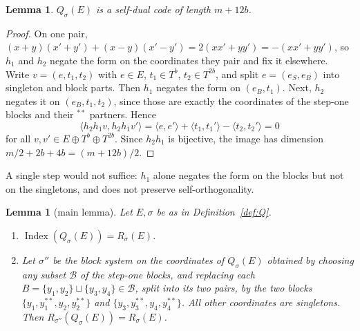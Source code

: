 \documentclass[11pt]{amsart}
\newtheorem{lemma}[theorem]{Lemma}
\theoremstyle{definition}
\newcommand{\Index}{\operatorname{Index}}
\begin{document}
\begin{lemma}
$Q_\sigma(E)$ is a self-dual code of length $m+12b$.
\end{lemma}

\begin{proof}
On one pair, $(x+y)(x'+y')+(x-y)(x'-y')=2(xx'+yy')=-(xx'+yy')$, so $h_1$ and $h_2$ negate the
form on the coordinates they pair and fix it elsewhere. Write $v=(e,t_1,t_2)$ with $e\in E$,
$t_1\in T^b$, $t_2\in T^{2b}$, and split $e=(e_S,e_B)$ into singleton and block parts. Then $h_1$
negates the form on $(e_B,t_1)$. Next, $h_2$ negates it on $(e_B,t_1,t_2)$, since those are exactly the coordinates of the step-one blocks and their $^{**}$ partners. Hence
\[
  \langle h_2h_1v,h_2h_1v'\rangle=\langle e,e'\rangle+\langle t_1,t_1'\rangle-\langle t_2,t_2'\rangle=0
\]
for all $v,v'\in E\oplus T^b\oplus T^{2b}$. Since $h_2h_1$ is bijective, the image has dimension
$m/2+2b+4b=(m+12b)/2$.
\end{proof}

A single step would not suffice: $h_1$ alone negates the form on the blocks but not on the
singletons, and does not preserve self-orthogonality.

\begin{lemma}[main lemma]\label{lem:main}
Let $E,\sigma$ be as in Definition~\ref{def:Q}.
\begin{enumerate}
\item $\Index(Q_\sigma(E))=R_\sigma(E)$.
\item Let $\sigma''$ be the block system on the coordinates of $Q_\sigma(E)$ obtained by choosing any
subset $\mathcal B$ of the step-one blocks, and replacing each $B=\{y_1,y_2\}\sqcup\{y_3,y_4\}\in\mathcal B$,
split into its two pairs, by the two
blocks $\{y_1,y_1^{**},y_2,y_2^{**}\}$ and $\{y_3,y_3^{**},y_4,y_4^{**}\}$. All other coordinates are singletons. Then
$R_{\sigma''}(Q_\sigma(E))=R_\sigma(E)$.
\end{enumerate}
\end{lemma}
\end{document}
